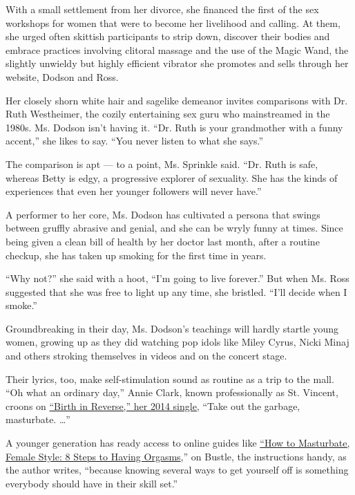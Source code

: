 With a small settlement from her divorce, she financed the first of the
sex workshops for women that were to become her livelihood and calling.
At them, she urged often skittish participants to strip down, discover
their bodies and embrace practices involving clitoral massage and the
use of the Magic Wand, the slightly unwieldy but highly efficient
vibrator she promotes and sells through her website, Dodson and Ross.

Her closely shorn white hair and sagelike demeanor invites comparisons
with Dr. Ruth Westheimer, the cozily entertaining sex guru who
mainstreamed in the 1980s. Ms. Dodson isn't having it. ``Dr. Ruth is
your grandmother with a funny accent,'' she likes to say. ``You never
listen to what she says.''

The comparison is apt --- to a point, Ms. Sprinkle said. ``Dr. Ruth is
safe, whereas Betty is edgy, a progressive explorer of sexuality. She
has the kinds of experiences that even her younger followers will never
have.''

A performer to her core, Ms. Dodson has cultivated a persona that swings
between gruffly abrasive and genial, and she can be wryly funny at
times. Since being given a clean bill of health by her doctor last
month, after a routine checkup, she has taken up smoking for the first
time in years.

``Why not?'' she said with a hoot, ``I'm going to live forever.'' But
when Ms. Ross suggested that she was free to light up any time, she
bristled. ``I'll decide when I smoke.''

Groundbreaking in their day, Ms. Dodson's teachings will hardly startle
young women, growing up as they did watching pop idols like Miley Cyrus,
Nicki Minaj and others stroking themselves in videos and on the concert
stage.

Their lyrics, too, make self-stimulation sound as routine as a trip to
the mall. ``Oh what an ordinary day,'' Annie Clark, known professionally
as St. Vincent, croons on
\href{https://www.youtube.com/watch?v=TAdARF4rGcQ}{``Birth in Reverse,''
her 2014 single,} ``Take out the garbage, masturbate. \ldots{}''

A younger generation has ready access to online guides like
\href{https://www.bustle.com/articles/39485-how-to-masturbate-female-style-8-steps-to-having-orgasms-without-a-vibrator}{``How
to Masturbate, Female Style: 8 Steps to Having Orgasms},'' on Bustle,
the instructions handy, as the author writes, ``because knowing several
ways to get yourself off is something everybody should have in their
skill set.''

